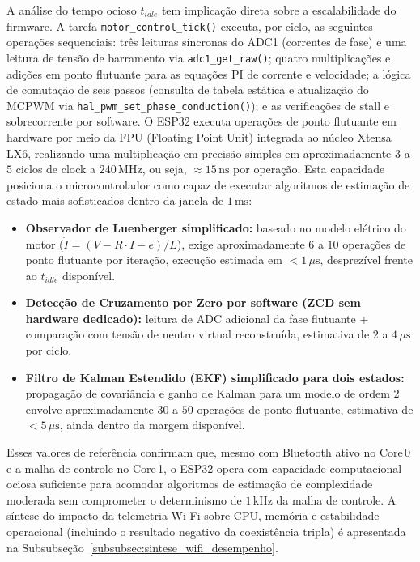 A análise do tempo ocioso $t_{idle}$ tem implicação direta sobre a escalabilidade do firmware. A tarefa \texttt{motor\_control\_tick()} executa, por ciclo, as seguintes operações sequenciais: três leituras síncronas do ADC1 (correntes de fase) e uma leitura de tensão de barramento via \texttt{adc1\_get\_raw()}; quatro multiplicações e adições em ponto flutuante para as equações PI de corrente e velocidade; a lógica de comutação de seis passos (consulta de tabela estática e atualização do MCPWM via \texttt{hal\_pwm\_set\_phase\_conduction()}); e as verificações de stall e sobrecorrente por software. O ESP32 executa operações de ponto flutuante em hardware por meio da FPU (Floating Point Unit) integrada ao núcleo Xtensa LX6, realizando uma multiplicação em precisão simples em aproximadamente $3$ a $5$ ciclos de clock a $240\,\text{MHz}$, ou seja, $\approx 15\,\text{ns}$ por operação. Esta capacidade posiciona o microcontrolador como capaz de executar algoritmos de estimação de estado mais sofisticados dentro da janela de $1\,\text{ms}$:

\begin{itemize}
    \item \textbf{Observador de Luenberger simplificado:} baseado no modelo elétrico do motor ($\dot{I} = (V - R \cdot I - e) / L$), exige aproximadamente $6$ a $10$ operações de ponto flutuante por iteração, execução estimada em $< 1\,\mu\text{s}$, desprezível frente ao $t_{idle}$ disponível.
    \item \textbf{Detecção de Cruzamento por Zero por software (ZCD sem hardware dedicado):} leitura de ADC adicional da fase flutuante + comparação com tensão de neutro virtual reconstruída, estimativa de $2$ a $4\,\mu\text{s}$ por ciclo.
    \item \textbf{Filtro de Kalman Estendido (EKF) simplificado para dois estados:} propagação de covariância e ganho de Kalman para um modelo de ordem 2 envolve aproximadamente $30$ a $50$ operações de ponto flutuante, estimativa de $< 5\,\mu\text{s}$, ainda dentro da margem disponível.
\end{itemize}

Esses valores de referência confirmam que, mesmo com Bluetooth ativo no Core\,0 e a malha de controle no Core\,1, o ESP32 opera com capacidade computacional ociosa suficiente para acomodar algoritmos de estimação de complexidade moderada sem comprometer o determinismo de $1\,\text{kHz}$ da malha de controle. A síntese do impacto da telemetria Wi-Fi sobre CPU, memória e estabilidade operacional (incluindo o resultado negativo da coexistência tripla) é apresentada na Subsubseção~\ref{subsubsec:sintese_wifi_desempenho}.


